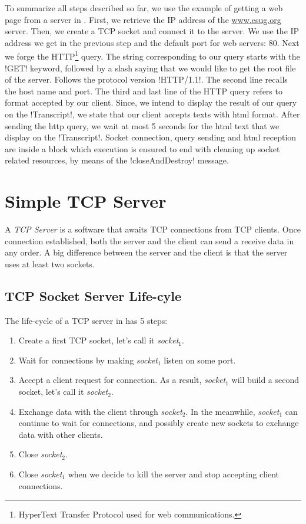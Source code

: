\documentclass[a4paper,10pt,twoside]{book}
\begin{document}
To summarize all steps described so far, we use the example of getting a web page from a server in  .
First, we retrieve the IP address of the \url{www.esug.org} server.
Then, we create a TCP socket and connect it to the server.
We use the IP address we get in the previous step and the default port for web servers: 80.
Next we forge the HTTP\footnote{HyperText Transfer Protocol used for web communications.} query.
The string corresponding  to our query starts with the \ct!GET! keyword, followed by a slash saying that we would like to get the root file of the server.
Follows the protocol version \ct!HTTP/1.1!.
The second line recalls the host name and port.
The third and last line of the HTTP query refers to format accepted by our client. 
Since, we intend to display the result of our query on the \ct!Transcript!, we state that our client accepts texts with html format.
After sending the http query, we wait at most 5 seconds for the html text that we display on the \ct!Transcript!.
Socket connection, query sending and html reception are inside a block which execution is ensured to end with cleaning up socket related resources, by means of the \ct!closeAndDestroy! message.

\section{Simple TCP Server}
A {\em TCP Server} is a software that awaits TCP connections from TCP clients.
Once connection established, both the server and the client can send a receive data in any order.
A big difference between the server and the client is that the server uses at least two sockets.

\subsection{TCP Socket Server Life-cyle}
The life-cycle of a TCP server in \pharo  has 5 steps:
\begin{enumerate}
\item Create a first TCP socket, let's call it {\em socket$_1$}.
\item Wait for connections by making {\em socket$_1$}  listen on some port.
\item Accept a client request for connection. As a result,  {\em socket$_1$} will build a second socket, let's call it {\em socket$_2$}.
\item Exchange data with the client through {\em socket$_2$}. In the meanwhile, {\em socket$_1$} can continue to wait for connections, and possibly create new sockets to exchange data with other clients. 
\item Close {\em socket$_2$}.
\item Close {\em socket$_1$} when we decide to kill the server and stop accepting client connections.
\end{enumerate}
\end{document}
